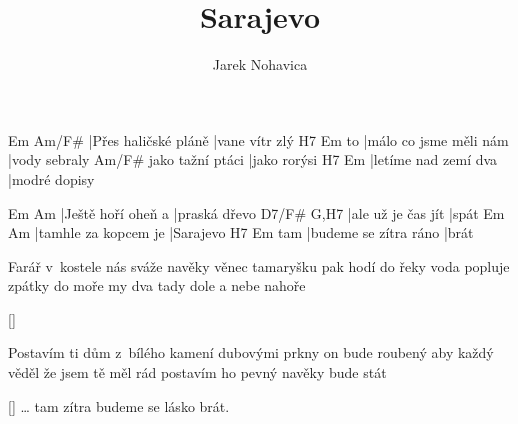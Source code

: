 \documentclass{song}
\title{Sarajevo}
\author{Jarek Nohavica}
\begin{document}
\strophe
Em                   Am/F\#
|Přes haličské pláně |vane vítr zlý
   H7                     Em
to |málo co jsme měli nám |vody sebraly
                 Am/F\#
jako tažní ptáci |jako rorýsi
H7                   Em
|letíme nad zemí dva |modré dopisy
\endstrophe

Em                 Am
|Ještě hoří oheň a |praská dřevo
D7/F\#             G,H7
|ale už je čas jít |spát
Em                   Am
|tamhle za kopcem je |Sarajevo
    H7                    Em
tam |budeme se zítra ráno |brát
\endstrophe

\strophe*
Farář v~kostele nás sváže navěky
věnec tamaryšku pak hodí do řeky
voda popluje zpátky do moře
my dva tady dole a nebe nahoře
\endstrophe

\ref{}

\strophe*
Postavím ti dům z~bílého kamení
dubovými prkny on bude roubený
aby každý věděl že jsem tě měl rád
postavím ho pevný navěky bude stát
\endstrophe

\ref{} \ldots{} tam zítra budeme se lásko brát.
\end{document}
